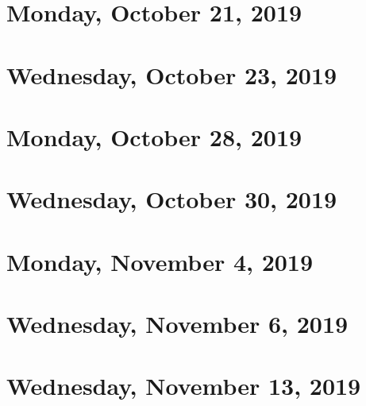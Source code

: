 \documentclass{../mynotes}
\begin{document}
\section{Monday, October 21, 2019}
    
\section{Wednesday, October 23, 2019}
    

\section{Monday, October 28, 2019}
    
\section{Wednesday, October 30, 2019}
    
    
\section{Monday, November 4, 2019}
    
\section{Wednesday, November 6, 2019}
    
    
\section{Wednesday, November 13, 2019}
    
\end{document}
